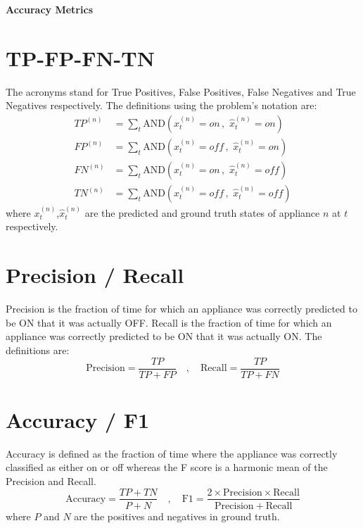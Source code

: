 \documentclass[landscape,fontscale=0.48,margin=2cm,paperwidth=135truecm,paperheight=89truecm]{baposter}
\begin{document}
\begin{poster}
\begin{posterbox}[column=2,below=auto,height = bottom]{\LARGE \bfseries Accuracy Metrics}
\section*{TP-FP-FN-TN}
The acronyms stand for True Positives, False Positives, False Negatives and True Negatives respectively. The definitions using the problem's notation are:
%
\begin{align}
  TP^{(n)} & = \sum_t \mathrm{AND}\left(x_t^{(n)}=on \,,\,\, \hat{x}_t^{(n)}=on\right) \\[6pt]
  FP^{(n)} & = \sum_t \mathrm{AND}\left(x_t^{(n)}=off \,,\,\, \hat{x}_t^{(n)}=on\right) \\[6pt]
  FN^{(n)} & = \sum_t \mathrm{AND}\left(x_t^{(n)}=on \,,\,\, \hat{x}_t^{(n)}=off\right) \\[6pt]
  TN^{(n)} & = \sum_t \mathrm{AND}\left(x_t^{(n)}=off \,,\,\, \hat{x}_t^{(n)}=off\right)
\end{align}
%
where $x_t^{(n)}$,$\hat{x}_t^{(n)}$ are the predicted and ground truth states of appliance $n$ at $t$ respectively.

\section*{Precision / Recall }
Precision is the fraction of time for which an appliance was correctly predicted to be ON that it was actually OFF. Recall is the fraction of time for which an appliance was correctly predicted to be ON that it was actually ON. The definitions are:
%
\begin{equation}
    \mathrm{Precision} = \frac{TP}{TP+FP} \quad , \quad  \mathrm{Recall} =\frac{TP}{TP+FN}
\end{equation}

\section*{Accuracy / F1}
Accuracy is defined as the fraction of time where the appliance was correctly classified as either on or off whereas the F score is a harmonic mean of the Precision and Recall.
%
\begin{equation}
    \mathrm{Accuracy}  = \frac{TP+TN}{P+N} \quad , \quad  \mathrm{F1} =\frac{2\times\mathrm{Precision}\times\mathrm{Recall}}{\mathrm{Precision}+\mathrm{Recall}}
\end{equation}
where $P$ and $N$ are the positives and negatives in ground truth.
\end{posterbox}



\end{poster}
\end{document}
